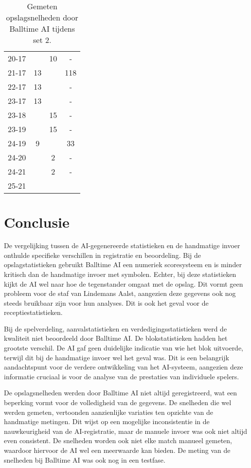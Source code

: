 \begin{table}[ht!]
\begin{tabular}{|c|c|c|c|}
    20-17 &  & 10 & - \\
    21-17 & 13 &  & 118 \\
    22-17 & 13 &  & - \\
    23-17 & 13 &  & - \\
    23-18 &  & 15 & - \\
    23-19 &  & 15 & - \\
    24-19 & 9 &  & 33 \\
    24-20 &  & 2 & - \\
    24-21 &  & 2 & - \\
    25-21 &  &  &  \\ \hline
  \end{tabular}
  \caption[Gemeten opslagsnelheden door Balltime AI tijdens set 2]{\label{tab:PL1ServeAI2}Gemeten opslagsnelheden door Balltime AI tijdens set 2.}
\end{table}

\section{Conclusie}
De vergelijking tussen de AI-gegenereerde statistieken en de handmatige invoer onthulde specifieke verschillen in registratie en beoordeling. Bij de opslagstatistieken gebruikt Balltime AI een numeriek scoresysteem en is minder kritisch dan de handmatige invoer met symbolen. Echter, bij deze statistieken kijkt de AI wel naar hoe de tegenstander omgaat met de opslag. Dit vormt geen probleem voor de staf van Lindemans Aalst, aangezien deze gegevens ook nog steeds bruikbaar zijn voor hun analyses. Dit is ook het geval voor de receptiestatistieken.

Bij de spelverdeling, aanvalstatistieken en verdedigingsstatistieken werd de kwaliteit niet beoordeeld door Balltime AI. De blokstatistieken hadden het grootste verschil. De AI gaf geen duidelijke indicatie van wie het blok uitvoerde, terwijl dit bij de handmatige invoer wel het geval was. Dit is een belangrijk aandachtspunt voor de verdere ontwikkeling van het AI-systeem, aangezien deze informatie cruciaal is voor de analyse van de prestaties van individuele spelers.

De opslagsnelheden werden door Balltime AI niet altijd geregistreerd, wat een beperking vormt voor de volledigheid van de gegevens. De snelheden die wel werden gemeten, vertoonden aanzienlijke variaties ten opzichte van de handmatige metingen. Dit wijst op een mogelijke inconsistentie in de nauwkeurigheid van de AI-registratie, maar de manuele invoer was ook niet altijd even consistent. De snelheden worden ook niet elke match manueel gemeten, waardoor hiervoor de AI wel een meerwaarde kan bieden. De meting van de snelheden bij Balltime AI was ook nog in een testfase.

